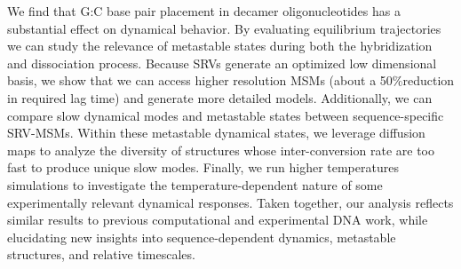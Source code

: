 \documentclass[journal=jpcbfk,manuscript=article]{achemso}
\begin{document}
We find that G:C base pair placement in decamer oligonucleotides has a substantial effect on dynamical behavior. By evaluating equilibrium trajectories we can study the relevance of metastable states during both the hybridization and dissociation process. Because SRVs generate an optimized low dimensional basis, we show that we can access higher resolution MSMs (about a 50\%reduction in required lag time) and generate more detailed models. Additionally, we can compare slow dynamical modes and metastable states between sequence-specific SRV-MSMs. Within these metastable dynamical states, we leverage diffusion maps to analyze the diversity of structures whose inter-conversion rate are too fast to produce unique slow modes. Finally, we run higher temperatures simulations to investigate the temperature-dependent nature of some experimentally relevant dynamical responses. Taken together, our analysis reflects similar results to previous computational and experimental DNA work, while elucidating new insights into sequence-dependent dynamics, metastable structures, and relative timescales. 




\end{document}
